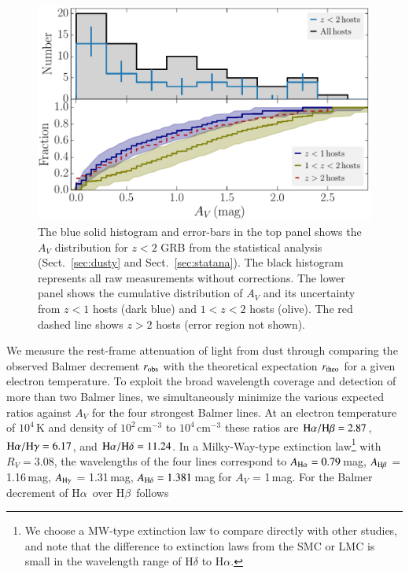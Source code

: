 \documentclass[traditabstract, longauth]{aa}
\newcommand{\hb}{H$\beta$}
\newcommand{\ha}{H$\alpha$}
\begin{document}
\begin{figure}
\includegraphics[angle=0, width=0.99\columnwidth]{Figs/EBV_histogram.pdf}
\caption{The blue solid histogram and error-bars in the top panel shows the $A_V$ distribution for $z < 2$ GRB from the statistical analysis (Sect.~\ref{sec:dusty} and Sect.~\ref{sec:statana}). The black histogram represents all raw measurements without corrections. The lower panel shows the cumulative distribution of $A_V$ and its uncertainty from $z<1$ hosts (dark blue) and $1<z<2$ hosts (olive). The red dashed line shows $z>2$ hosts (error region not shown).}
\label{fig:ebvhist}
\end{figure}

We measure the rest-frame attenuation of light from dust through comparing the observed Balmer decrement $r_{\rm{obs}}$ with the theoretical expectation $r_{\rm{theo}}$ for a given electron temperature. To exploit the broad wavelength coverage and detection of more than two Balmer lines, we simultaneously minimize the various expected ratios against $A_V$ for the four strongest Balmer lines. At an electron temperature of $10^4$\,K and density of $10^{2}$\,cm$^{-3}$ to $10^{4}$\,cm$^{-3}$ these ratios are \citep{1989agna.book.....O} $\rm{H}\alpha/\rm{H}\beta = 2.87$, $\rm{H}\alpha/\rm{H}\gamma = 6.17$, and $\rm{H}\alpha/\rm{H}\delta = 11.24$. In a Milky-Way-type extinction law\footnote{We choose a MW-type extinction law to compare directly with other studies, and note that the difference to extinction laws from the SMC or LMC is small in the wavelength range of H$\delta$ to H$\alpha$.} \citep[][]{1992ApJ...395..130P} with $R_V=3.08$, the wavelengths of the four lines correspond to $A_{\rm{H}\alpha} = 0.79$\,mag, $A_{\rm{H}\beta}$ = 1.16\,mag, $A_{\rm{H}\gamma}$ = 1.31\,mag, $A_{\rm{H}\delta} = 1.381$\,mag for $A_V$ = 1\,mag. For the Balmer decrement of \ha\, over \hb\, follows
\end{document}
